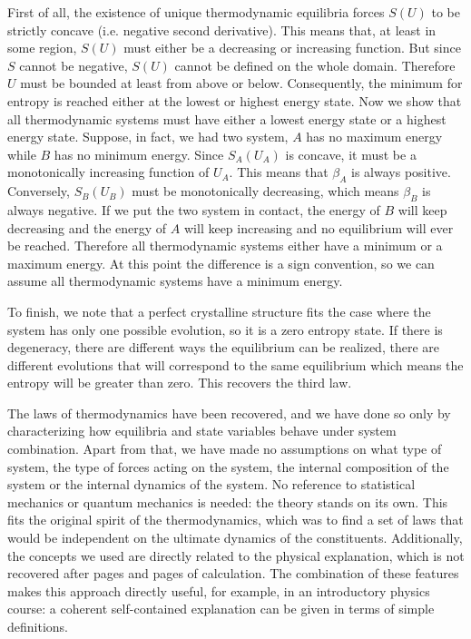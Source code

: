 \documentclass[letterpaper,twocolumn]{article}
\begin{document}
First of all, the existence of unique thermodynamic equilibria forces $S(U)$ to be strictly concave (i.e. negative second derivative). This means that, at least in some region, $S(U)$ must either be a decreasing or increasing function. But since $S$ cannot be negative, $S(U)$ cannot be defined on the whole domain. Therefore $U$ must be bounded at least from above or below. Consequently, the minimum for entropy is reached either at the lowest or highest energy state. Now we show that all thermodynamic systems must have either a lowest energy state or a highest energy state. Suppose, in fact, we had two system, $A$ has no maximum energy while $B$ has no minimum energy. Since $S_A(U_A)$ is concave, it must be a monotonically increasing function of $U_A$. This means that $\beta_A$ is always positive. Conversely, $S_B(U_B)$ must be monotonically decreasing, which means $\beta_B$ is always negative. If we put the two system in contact, the energy of $B$ will keep decreasing and the energy of $A$ will keep increasing and no equilibrium will ever be reached. Therefore all thermodynamic systems either have a minimum or a maximum energy. At this point the difference is a sign convention, so we can assume all thermodynamic systems have a minimum energy.

To finish, we note that a perfect crystalline structure fits the case where the system has only one possible evolution, so it is a zero entropy state. If there is degeneracy, there are different ways the equilibrium can be realized, there are different evolutions that will correspond to the same equilibrium which means the entropy will be greater than zero. This recovers the third law.

The laws of thermodynamics have been recovered, and we have done so only by characterizing how equilibria and state variables behave under system combination. Apart from that, we have made no assumptions on what type of system, the type of forces acting on the system, the internal composition of the system or the internal dynamics of the system. No reference to statistical mechanics or quantum mechanics is needed: the theory stands on its own. This fits the original spirit of the thermodynamics, which was to find a set of laws that would be independent on the ultimate dynamics of the constituents. Additionally, the concepts we used are directly related to the physical explanation, which is not recovered after pages and pages of calculation. The combination of these features makes this approach directly useful, for example, in an introductory physics course: a coherent self-contained explanation can be given in terms of simple definitions.
\end{document}
